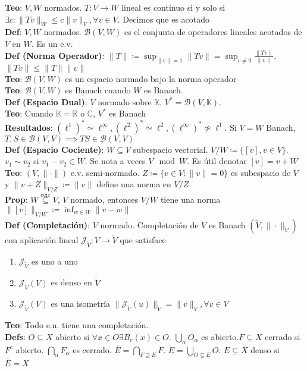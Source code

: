 \documentclass[9pt, letterpaper]{extarticle}
\newcommand{\C}{\mathbb{C}}
\newcommand{\R}{\mathbb{R}}
\newcommand{\K}{\mathbb{K}}
\begin{document}
\begin{multicols*}{2}
\textbf{Teo}: $V,W$ normados. $T:V\to W$ lineal es continuo si y solo si $\exists c:\|Tv\|_W\leq c\|v\|_V,\forall v\in V$. Decimos que es acotado\\
\textbf{Def}: $V,W$ normados. $\mathcal{B}(V,W)$ es el conjunto de operadores lineales acotados de $V$ en $W$. Es un e.v.\\
\textbf{Def (Norma Operador)}: $\|T\|\coloneqq \sup_{\|v\|=1}\|Tv\|=\sup_{v\neq 0}\frac{\|Tv\|}{\|v\|}$. $\|Tv\|\leq \|T\|\|v\|$\\
\textbf{Teo}: $\mathcal{B}(V,W)$ es un espacio normado bajo la norma operador\\
\textbf{Teo}: $\mathcal{B}(V,W)$ es Banach cuando $W$ es Banach.\\
\textbf{Def (Espacio Dual)}: $V$ normado sobre $\K$. $V^*=\mathcal{B}(V,\K)$.\\
\textbf{Teo}: Cuando $\K=\R\text{ o }\C$, $V^*$ es Banach\\
\textbf{Resultados}: $(\ell^1)^*\simeq \ell^\infty,(\ell^2)^*\simeq \ell^2,(\ell^\infty)^*\not\simeq\ell^1$. Si $V=W$ Banach, $T,S\in \mathcal{B}(V,V)\implies TS\in \mathcal{B}(V,V)$\\
\textbf{Def (Espacio Cociente)}: $W\subseteq V$ subespacio vectorial. $V/W\coloneqq \{[v],v\in V\}$. $v_1\sim v_2$ si $v_1-v_2\in W$. Se nota a veces $V\mod W$. Es útil denotar $[v]=v+W$\\
\textbf{Teo}: $(V,\|\cdot\|)$ e.v. semi-normado. $Z\coloneqq \{v\in V:\|v\|=0\}$ es subespacio de $V$ y $\|v+Z\|_{V/Z}\coloneqq \|v\|$ define una norma en $V/Z$\\
\textbf{Prop}: $W\overset{\text{cerr}}{\subseteq}V$, $V$ normado, entonces $V/W$ tiene una norma $\|[v]\|_{V/W}\coloneqq \inf_{w\in W}\|v-w\|$\\
\textbf{Def (Completación)}: $V$ normado. Completación de $V$ es Banach $(\tilde V,\|\cdot\|_{\tilde V})$ con aplicación lineal $\mathcal{J}_{\tilde V}:V\to \tilde V$ que satisface
\begin{enumerate}
	\item $\mathcal{J}_{\tilde V}$ es uno a uno
	\item $\mathcal{J}_{\tilde V}(V)$ es denso en $\tilde V$
	\item $\mathcal{J}_{\tilde V}(V)$ es una isometría $\|\mathcal{J}_{\tilde V}(u)\|_{\tilde V}=\|v\|_V,\forall v\in V$
\end{enumerate}
\textbf{Teo}: Todo e.n. tiene una completación.\\
\textbf{Defs}: $O\subseteq X$ abierto si $\forall x\in O\exists B_r(x)\in O$. $\bigcup_\alpha O_\alpha$ es abierto.$F\subseteq X$ cerrado si $F^c$ abierto. $\bigcap_\alpha F_\alpha$ es cerrado. $\overline E=\bigcap_{F\supseteq E}F$. $\mathring{E}=\bigcup_{O\subseteq E} O$. $E\subseteq X$ denso si $\overline{E}=X$\\

\end{multicols*}
\end{document}
